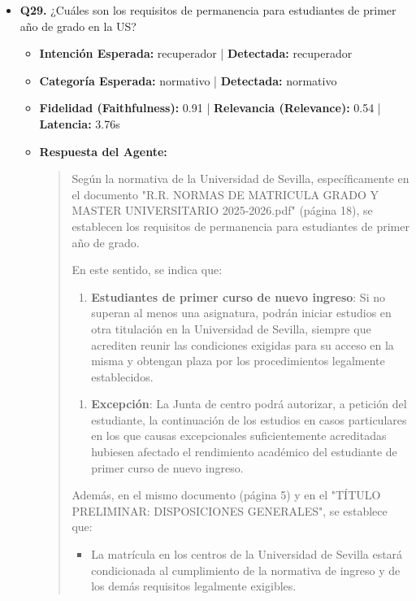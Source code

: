 \documentclass[12pt,a4paper,oneside]{report}
\begin{document}
\begin{itemize}
  
\item \textbf{Q29.} ¿Cuáles son los requisitos de permanencia para estudiantes de primer año de grado en la US? \\
        \begin{itemize}
          \item \textbf{Intención Esperada:} recuperador | \textbf{Detectada:} recuperador
          \item \textbf{Categoría Esperada:} normativo | \textbf{Detectada:} normativo
          \item \textbf{Fidelidad (Faithfulness):} 0.91 | \textbf{Relevancia (Relevance):} 0.54 | \textbf{Latencia:} 3.76s
          \item \textbf{{Respuesta del Agente:}} \\
                \begin{quote}
Según la normativa de la Universidad de Sevilla, específicamente en el documento "R.R. NORMAS DE MATRICULA GRADO Y MASTER UNIVERSITARIO 2025-2026.pdf" (página 18), se establecen los requisitos de permanencia para estudiantes de primer año de grado.

En este sentido, se indica que:

\begin{enumerate}
  \item \textbf{Estudiantes de primer curso de nuevo ingreso}: Si no superan al menos una asignatura, podrán iniciar estudios en otra titulación en la Universidad de Sevilla, siempre que acrediten reunir las condiciones exigidas para su acceso en la misma y obtengan plaza por los procedimientos legalmente establecidos.
\end{enumerate}

\begin{enumerate}
  \item \textbf{Excepción}: La Junta de centro podrá autorizar, a petición del estudiante, la continuación de los estudios en casos particulares en los que causas excepcionales suficientemente acreditadas hubiesen afectado el rendimiento académico del estudiante de primer curso de nuevo ingreso.
\end{enumerate}

Además, en el mismo documento (página 5) y en el "TÍTULO PRELIMINAR: DISPOSICIONES GENERALES", se establece que:

\begin{itemize}
  \item La matrícula en los centros de la Universidad de Sevilla estará condicionada al cumplimiento de la normativa de ingreso y de los demás requisitos legalmente exigibles.
\end{itemize}


\end{quote}
\end{itemize}
\end{itemize}
\end{document}
